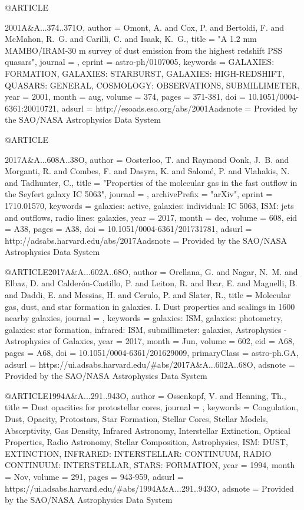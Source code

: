 \documentclass[longauth]{aa}
\begin{document}
{@ARTICLE{2001A&A...374..371O,
   author = {{Omont}, A. and {Cox}, P. and {Bertoldi}, F. and {McMahon}, R.~G. and 
	{Carilli}, C. and {Isaak}, K.~G.},
    title = "{A 1.2 mm MAMBO/IRAM-30 m survey of dust emission from the highest redshift PSS quasars}",
  journal = {\aap},
   eprint = {astro-ph/0107005},
 keywords = {GALAXIES: FORMATION, GALAXIES: STARBURST, GALAXIES: HIGH-REDSHIFT, QUASARS: GENERAL, COSMOLOGY: OBSERVATIONS, SUBMILLIMETER},
     year = 2001,
    month = aug,
   volume = 374,
    pages = {371-381},
      doi = {10.1051/0004-6361:20010721},
   adsurl = {http://esoads.eso.org/abs/2001Aadsnote = {Provided by the SAO/NASA Astrophysics Data System}
}

@ARTICLE{2017A&A...608A..38O,
   author = {{Oosterloo}, T. and {Raymond Oonk}, J.~B. and {Morganti}, R. and 
	{Combes}, F. and {Dasyra}, K. and {Salom{\'e}}, P. and {Vlahakis}, N. and 
	{Tadhunter}, C.},
    title = "{Properties of the molecular gas in the fast outflow in the Seyfert galaxy IC 5063}",
  journal = {\aap},
archivePrefix = "arXiv",
   eprint = {1710.01570},
 keywords = {galaxies: active, galaxies: individual: IC 5063, ISM: jets and outflows, radio lines: galaxies},
     year = 2017,
    month = dec,
   volume = 608,
      eid = {A38},
    pages = {A38},
      doi = {10.1051/0004-6361/201731781},
   adsurl = {http://adsabs.harvard.edu/abs/2017Aadsnote = {Provided by the SAO/NASA Astrophysics Data System}
}

@ARTICLE{2017A&A...602A..68O,
       author = {{Orellana}, G. and {Nagar}, N.~M. and {Elbaz}, D. and {Calder{\'o}n-Castillo}, P. and {Leiton}, R. and {Ibar}, E. and {Magnelli}, B. and {Daddi}, E. and {Messias}, H. and {Cerulo}, P. and {Slater}, R.},
        title = {Molecular gas, dust, and star formation in galaxies. I. Dust properties and scalings in  1600 nearby galaxies},
      journal = {\aap},
     keywords = {galaxies: ISM, galaxies: photometry, galaxies: star formation, infrared: ISM, submillimeter: galaxies, Astrophysics - Astrophysics of Galaxies},
         year = 2017,
        month = Jun,
       volume = {602},
          eid = {A68},
        pages = {A68},
          doi = {10.1051/0004-6361/201629009},
 primaryClass = {astro-ph.GA},
       adsurl = {https://ui.adsabs.harvard.edu/#abs/2017A&A...602A..68O},
      adsnote = {Provided by the SAO/NASA Astrophysics Data System}
}

@ARTICLE{1994A&A...291..943O,
       author = {{Ossenkopf}, V. and {Henning}, Th.},
        title = {Dust opacities for protostellar cores},
      journal = {\aap},
     keywords = {Coagulation, Dust, Opacity, Protostars, Star Formation, Stellar Cores, Stellar Models, Absorptivity, Gas Density, Infrared Astronomy, Interstellar Extinction, Optical Properties, Radio Astronomy, Stellar Composition, Astrophysics, ISM: DUST, EXTINCTION, INFRARED: INTERSTELLAR: CONTINUUM, RADIO CONTINUUM: INTERSTELLAR, STARS: FORMATION},
         year = 1994,
        month = Nov,
       volume = {291},
        pages = {943-959},
       adsurl = {https://ui.adsabs.harvard.edu/#abs/1994A&A...291..943O},
      adsnote = {Provided by the SAO/NASA Astrophysics Data System}
}

}}}
\end{document}
